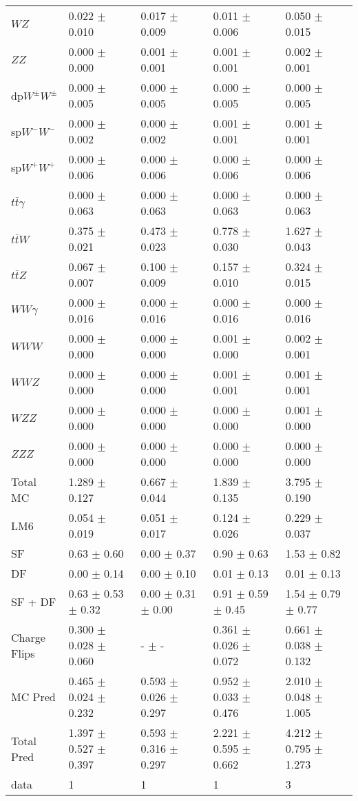 \begin{tabular}{l | l l l l}
$WZ$ &  0.022 $\pm$  0.010 &  0.017 $\pm$  0.009 &  0.011 $\pm$  0.006 &  0.050 $\pm$  0.015\\
$ZZ$ &  0.000 $\pm$   0.000 &  0.001 $\pm$  0.001 &  0.001 $\pm$  0.001 &  0.002 $\pm$  0.001\\
\hline
dp$W^{\pm}W^{\pm}$ &  0.000 $\pm$  0.005 &  0.000 $\pm$  0.005 &  0.000 $\pm$  0.005 &  0.000 $\pm$  0.005\\
sp$W^{-}W^{-}$ &  0.000 $\pm$  0.002 &  0.000 $\pm$  0.002 &  0.001 $\pm$  0.001 &  0.001 $\pm$  0.001\\
sp$W^{+}W^{+}$ &  0.000 $\pm$  0.006 &  0.000 $\pm$  0.006 &  0.000 $\pm$  0.006 &  0.000 $\pm$  0.006\\
$t\overline{t}\gamma$ &  0.000 $\pm$  0.063 &  0.000 $\pm$  0.063 &  0.000 $\pm$  0.063 &  0.000 $\pm$  0.063\\
$t\overline{t}W$ &  0.375 $\pm$  0.021 &  0.473 $\pm$  0.023 &  0.778 $\pm$  0.030 &  1.627 $\pm$  0.043\\
$t\overline{t}Z$ &  0.067 $\pm$  0.007 &  0.100 $\pm$  0.009 &  0.157 $\pm$  0.010 &  0.324 $\pm$  0.015\\
$WW\gamma$ &  0.000 $\pm$  0.016 &  0.000 $\pm$  0.016 &  0.000 $\pm$  0.016 &  0.000 $\pm$  0.016\\
$WWW$ &   0.000 $\pm$   0.000 &   0.000 $\pm$   0.000 &  0.001 $\pm$   0.000 &  0.002 $\pm$  0.001\\
$WWZ$ &   0.000 $\pm$   0.000 &   0.000 $\pm$   0.000 &  0.001 $\pm$  0.001 &  0.001 $\pm$  0.001\\
$WZZ$ &   0.000 $\pm$   0.000 &   0.000 $\pm$   0.000 &   0.000 $\pm$   0.000 &  0.001 $\pm$   0.000\\
$ZZZ$ &   0.000 $\pm$   0.000 &   0.000 $\pm$   0.000 &   0.000 $\pm$   0.000 &   0.000 $\pm$   0.000\\
\hline
Total MC &  1.289 $\pm$  0.127 &  0.667 $\pm$  0.044 &  1.839 $\pm$  0.135 &  3.795 $\pm$  0.190\\
\hline\hline
\hline
LM6 &  0.054 $\pm$  0.019 &  0.051 $\pm$  0.017 &  0.124 $\pm$  0.026 &  0.229 $\pm$  0.037\\
\hline\hline
\hline\hline
 SF  & 0.63 $\pm$ 0.60 & 0.00 $\pm$ 0.37 & 0.90 $\pm$ 0.63 & 1.53 $\pm$ 0.82\\
 DF  & 0.00 $\pm$ 0.14 & 0.00 $\pm$ 0.10 & 0.01 $\pm$ 0.13 & 0.01 $\pm$ 0.13\\
\hline
 SF + DF  & 0.63 $\pm$ 0.53 $\pm$ 0.32 & 0.00 $\pm$ 0.31 $\pm$ 0.00 & 0.91 $\pm$ 0.59 $\pm$ 0.45 & 1.54 $\pm$ 0.79 $\pm$ 0.77\\
\hline\hline
Charge Flips & 0.300 $\pm$ 0.028 $\pm$ 0.060 & - $\pm$ - & 0.361 $\pm$ 0.026 $\pm$ 0.072 & 0.661 $\pm$ 0.038 $\pm$ 0.132\\
\hline\hline
\hline
MC Pred &  0.465 $\pm$  0.024 $\pm$  0.232 &  0.593 $\pm$  0.026 $\pm$  0.297 &  0.952 $\pm$  0.033 $\pm$  0.476 &  2.010 $\pm$  0.048 $\pm$  1.005\\
\hline\hline
Total Pred &  1.397 $\pm$  0.527 $\pm$  0.397 &  0.593 $\pm$  0.316 $\pm$  0.297 &  2.221 $\pm$  0.595 $\pm$  0.662 &  4.212 $\pm$  0.795 $\pm$  1.273\\
\hline\hline
data & 1 & 1 & 1 & 3\\
\hline\hline
\end{tabular}
